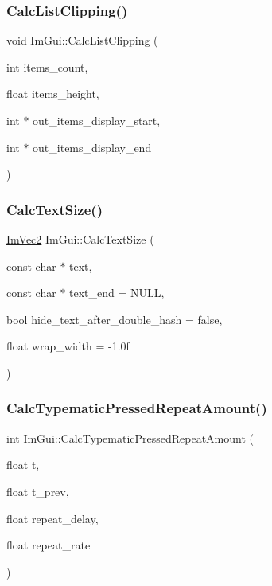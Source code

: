 \hypertarget{namespace_im_gui_ae5319370628374ef8febf0c25c285b7e}{}\label{namespace_im_gui_ae5319370628374ef8febf0c25c285b7e} 
\subsubsection{\texorpdfstring{Calc\+List\+Clipping()}{CalcListClipping()}}
{\footnotesize\ttfamily void Im\+Gui\+::\+Calc\+List\+Clipping (\begin{DoxyParamCaption}\item[{int}]{items\+\_\+count,  }\item[{float}]{items\+\_\+height,  }\item[{int $\ast$}]{out\+\_\+items\+\_\+display\+\_\+start,  }\item[{int $\ast$}]{out\+\_\+items\+\_\+display\+\_\+end }\end{DoxyParamCaption})}

\hypertarget{namespace_im_gui_a848b9db6cc4a186751c0ecebcaadc33b}{}\label{namespace_im_gui_a848b9db6cc4a186751c0ecebcaadc33b} 
\subsubsection{\texorpdfstring{Calc\+Text\+Size()}{CalcTextSize()}}
{\footnotesize\ttfamily \hyperlink{struct_im_vec2}{Im\+Vec2} Im\+Gui\+::\+Calc\+Text\+Size (\begin{DoxyParamCaption}\item[{const char $\ast$}]{text,  }\item[{const char $\ast$}]{text\+\_\+end = {\ttfamily NULL},  }\item[{bool}]{hide\+\_\+text\+\_\+after\+\_\+double\+\_\+hash = {\ttfamily false},  }\item[{float}]{wrap\+\_\+width = {\ttfamily -\/1.0f} }\end{DoxyParamCaption})}

\hypertarget{namespace_im_gui_ad3af0fc327467a44116d7d04018b9124}{}\label{namespace_im_gui_ad3af0fc327467a44116d7d04018b9124} 
\subsubsection{\texorpdfstring{Calc\+Typematic\+Pressed\+Repeat\+Amount()}{CalcTypematicPressedRepeatAmount()}}
{\footnotesize\ttfamily int Im\+Gui\+::\+Calc\+Typematic\+Pressed\+Repeat\+Amount (\begin{DoxyParamCaption}\item[{float}]{t,  }\item[{float}]{t\+\_\+prev,  }\item[{float}]{repeat\+\_\+delay,  }\item[{float}]{repeat\+\_\+rate }\end{DoxyParamCaption})}


